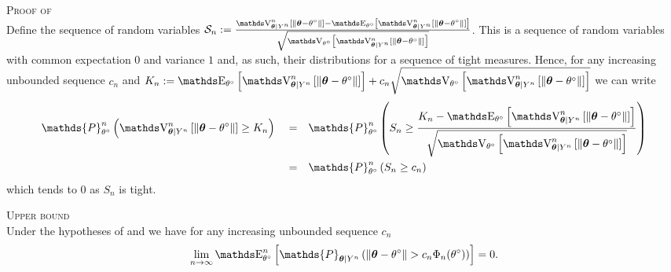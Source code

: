 \begin{pro}\label{pro2.5}{\textsc{Proof of }\\}
Define the sequence of random variables $\mathcal{S}_{n} := \frac{\V_{\boldsymbol{\theta} \vert Y^{n}}^{n}\left[\Vert \boldsymbol{\theta} - \theta^{\circ} \Vert \right] - \E_{\theta^{\circ}}\left[\V_{\boldsymbol{\theta} \vert Y^{n}}^{n}\left[\Vert \boldsymbol{\theta} - \theta^{\circ} \Vert \right]\right]}{\sqrt{\V_{\theta^{\circ}}\left[\V_{\boldsymbol{\theta} \vert Y^{n}}^{n}\left[\Vert \boldsymbol{\theta} - \theta^{\circ} \Vert \right]\right]}}$.
This is a sequence of random variables with common expectation $0$ and variance $1$ and, as such, their distributions for a sequence of tight measures.
Hence, for any increasing unbounded sequence $c_{n}$ and $K_{n} := \E_{\theta^{\circ}}\left[\V_{\boldsymbol{\theta} \vert Y^{n}}^{n}\left[\Vert \boldsymbol{\theta} - \theta^{\circ} \Vert \right]\right] + c_{n} \sqrt{\V_{\theta^{\circ}}\left[\V_{\boldsymbol{\theta} \vert Y^{n}}^{n}\left[\Vert \boldsymbol{\theta} - \theta^{\circ} \Vert \right]\right]}$ we can write
\begin{alignat*}{3}
& \mathds{P}_{\theta^{\circ}}^{n}\left(\V_{\boldsymbol{\theta} \vert Y^{n}}^{n}\left[\Vert \boldsymbol{\theta} - \theta^{\circ} \Vert \right] \geq K_{n}\right) && = && \mathds{P}_{\theta^{\circ}}^{n}\left(S_{n} \geq \frac{K_{n} - \E_{\theta^{\circ}}\left[\V_{\boldsymbol{\theta} \vert Y^{n}}^{n}\left[\Vert \boldsymbol{\theta} - \theta^{\circ} \Vert \right]\right]}{\sqrt{\V_{\theta^{\circ}}\left[\V_{\boldsymbol{\theta} \vert Y^{n}}^{n}\left[\Vert \boldsymbol{\theta} - \theta^{\circ} \Vert \right]\right]}}\right)\\
& &&=&& \mathds{P}_{\theta^{\circ}}^{n}\left(S_{n} \geq c_{n}\right)
\end{alignat*}
which tends to $0$ as $S_{n}$ is tight.
\end{pro}

\begin{thm}\label{thm2.2}{\textsc{Upper bound}\\}
Under the hypotheses of  and  we have for any increasing unbounded sequence $c_{n}$
\[\lim\limits_{n \rightarrow \infty} \E_{\theta^{\circ}}^{n}\left[\mathds{P}_{\boldsymbol{\theta} \vert Y^{n}}\left(\Vert \boldsymbol{\theta} - \theta^{\circ} \Vert > c_{n}\Phi_{n}(\theta^{\circ}) \right)\right] = 0.\]
\end{thm}

